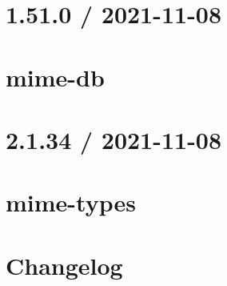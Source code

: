\documentclass[twoside]{book}
\newcommand{\+}{\discretionary{\mbox{\scriptsize$\hookleftarrow$}}{}{}}
\begin{document}
\chapter{1.51.0 / 2021-\/11-\/08}
\label{md__c___users_vaishnavi_jadhav__desktop__developer_code_mean_stack_example_server_node_modules_mime_db__h_i_s_t_o_r_y}

\chapter{mime-\/db}
\label{md__c___users_vaishnavi_jadhav__desktop__developer_code_mean_stack_example_server_node_modules_mime_db__r_e_a_d_m_e}

\chapter{2.1.34 / 2021-\/11-\/08}
\label{md__c___users_vaishnavi_jadhav__desktop__developer_code_mean_stack_example_server_node_modules_mime_types__h_i_s_t_o_r_y}

\chapter{mime-\/types}
\label{md__c___users_vaishnavi_jadhav__desktop__developer_code_mean_stack_example_server_node_modules_mime_types__r_e_a_d_m_e}

\chapter{Changelog}
\label{md__c___users_vaishnavi_jadhav__desktop__developer_code_mean_stack_example_server_node_modules_mime__c_h_a_n_g_e_l_o_g}

\end{document}
